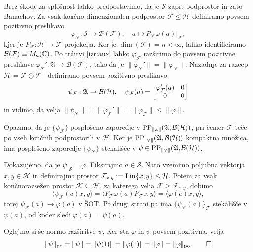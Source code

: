 \begin{dokaz}
    Brez škode za splošnost lahko predpostavimo, da je $\mathcal{S}$ zaprt podprostor in zato Banachov.
    Za vsak končno dimenzionalen podprostor $\mathcal{F} \leq \mathcal{H}$
    definiramo povsem pozitivno preslikavo $$\varphi_{\mathcal{F}}: \mathcal{S} \to \mathcal{B}(\mathcal{F}),\quad a \mapsto P_{\mathcal{F}} \varphi(a)\big|_{\mathcal{F}},$$
    kjer je $P_\mathcal{F}: \mathcal{H} \to \mathcal{F}$ projekcija.
    Ker je $\dim (\mathcal{F}) = n < \infty$, lahko identificiramo $\mathcal{B} (\mathcal{F}) \equiv M_n (\mathbb C)$.
    Po trditvi \ref{izr:aux} lahko $\varphi_{\mathcal{F}}$ razširimo do povsem pozitivne preslikave $\varphi_\mathcal{F} ' : \mathfrak{A} \to \mathcal{B}(\mathcal{F})$,
    tako da je $\| \varphi_{\mathcal{F}} '\| = \| \varphi_\mathcal{F}\|$.
    Nazadnje za razcep $\mathcal{H} = \mathcal{F} \oplus \mathcal{F}^\perp$ definiramo povsem pozitivno preslikavo
    $$\psi_{\mathcal{F}}: \mathfrak{A} \to \operatorname{\mathcal{B} (\mathcal{H})},\quad \psi_{\mathcal{F}} (a) = \begin{bmatrix}
        \varphi_{\mathcal{F}} ' (a) & 0\\
        0 & 0
    \end{bmatrix}$$
    in vidimo, da velja $\| \psi_{\mathcal{F}} \| = \| \varphi_{\mathcal{F}} ' \| = \| \varphi_{\mathcal{F}} \| \leq \| \varphi\|$.

    Opazimo, da je $\{\psi_{\mathcal{F}}\}$ posplošeno zaporedje v $\operatorname{PP}_{\| \varphi\|} (\mathfrak{A}, \operatorname{\mathcal{B} (\mathcal{H})})$,
    pri čemer $\mathcal{F}$ teče po vseh končnih podprostorih v $\mathcal{H}$.
    Ker je $\operatorname{PP}_{\| \varphi\|} (\mathfrak{A}, \operatorname{\mathcal{B} (\mathcal{H})})$ kompaktna množica, ima posplošeno zaporedje $\{\psi_{\mathcal{F}}\}$
    stekališče v $\psi \in \operatorname{PP}_{\| \varphi\|} (\mathfrak{A}, \operatorname{\mathcal{B} (\mathcal{H})})$. 

    Dokazujemo, da je $\psi\big|_{\mathcal{S}} = \varphi$. Fiksirajmo $a \in \mathcal{S}$. 
    Nato vzemimo poljubna vektorja $x, y \in \mathcal{H}$
    in definirajmo prostor $\mathcal{F}_{x, y} := \operatorname{Lin} \{x, y\} \leq \mathcal{H}$. Potem za vsak končnorazsežen prostor $\mathcal{K} \subseteq \mathcal{H}$,
    za katerega velja $\mathcal{F} \geq \mathcal{F}_{x, y}$, dobimo 
    $$\langle \psi_{\mathcal{F}}(a) x, y \rangle  = \langle P_{\mathcal{F}} \varphi(a)P_{\mathcal{F}} x, y\rangle = \langle \varphi (a) x, y  \rangle,$$
    torej $\psi_{\mathcal{F}} (a) \to \varphi (a)$ v ŠOT. Po drugi strani pa ima 
    $\{\psi_{\mathcal{F}} (a)\}_{\mathcal{F}}$ stekališče v $\psi(a)$, od koder sledi $\varphi(a) = \psi(a)$.

    Oglejmo si še normo razširitve $\psi$. Ker sta $\varphi$ in $\psi$ povsem pozitivna, velja
    \begin{equation*}
        \| \psi \|_{\operatorname{po}} = \| \psi \| = \| \psi (1) \| = \| \varphi(1) \| = \| \varphi \| = \| \varphi \|_{\operatorname{po}}. \qedhere 
    \end{equation*}
\end{dokaz}

